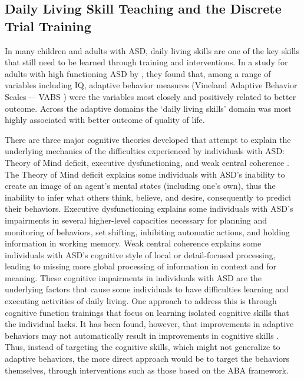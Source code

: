 \documentclass{ut-thesis}
\begin{document}
\subsection{Daily Living Skill Teaching and the Discrete Trial Training}
In many children and adults with ASD, daily living skills are one of the key skills that still need to be learned through training and interventions.  In a study for adults with high functioning ASD by \cite{farley2009twenty}, they found that, among a range of variables including IQ, adaptive behavior measures (Vineland Adaptive Behavior Scales -– VABS \cite{sparrow2005vineland}) were the variables most closely and positively related to better outcome. Across the adaptive domains the ‘daily living skills’ domain was most highly associated with better outcome of quality of life.

There are three major cognitive theories developed that attempt to explain the underlying mechanics of the difficulties experienced by individuals with ASD: Theory of Mind deficit, executive dysfunctioning, and weak central coherence \cite{rajendran2007cognitive}.  The Theory of Mind deficit explains some individuals with ASD's inability to create an image of an agent's mental states (including one's own), thus the inability to infer what others think, believe, and desire, consequently to predict their behaviors.  Executive dysfunctioning explains some individuals with ASD's impairments in several higher-level capacities necessary for planning and monitoring of behaviors, set shifting, inhibiting automatic actions, and holding information in working memory.  Weak central coherence explains some individuals with ASD's cognitive style of local or detail-focused processing, leading to missing more global processing of information in context and for meaning.  These cognitive impairments in individuals with ASD are the underlying factors that cause some individuals to have difficulties learning and executing activities of daily living.  One approach to address this is through cognitive function trainings that focus on learning isolated cognitive skills that the individual lacks.  It has been found, however, that improvements in adaptive behaviors may not automatically result in improvements in cognitive skills \cite{chin2000teaching, teunisse2007cognitieve}.  Thus, instead of targeting the cognitive skills, which might not generalize to adaptive behaviors, the more direct approach would be to target the behaviors themselves, through interventions such as those based on the ABA framework.
\end{document}
